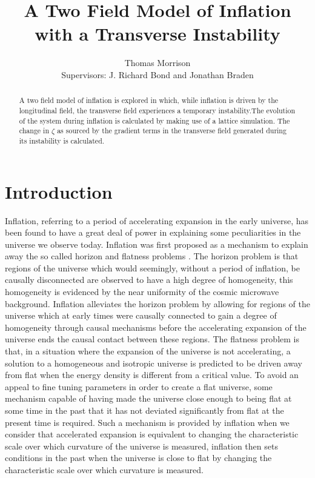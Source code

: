 \documentclass[letterpaper,11pt]{article}
\title{A Two Field Model of Inflation with a Transverse Instability}
\author{Thomas Morrison\\ Supervisors: J. Richard Bond and Jonathan Braden}
\begin{document}
\maketitle
\begin{abstract}
A two field model of inflation is explored in which, while inflation is driven by the longitudinal field, the transverse field experiences a temporary instability.The evolution of the system during inflation is calculated by making use of a lattice simulation. The change in $\zeta$ as sourced by the gradient terms in the transverse field generated during its instability is calculated.
\end{abstract}
\section{Introduction}
Inflation, referring to a period of accelerating expansion in the early universe, has been found to have a great deal of power in explaining some peculiarities in the universe we observe today. 
Inflation was first proposed as a mechanism to explain away the so called horizon and flatness problems \cite{guth81}. The horizon problem is that regions of the universe which would seemingly, without a period of inflation, be causally disconnected are observed to have a high degree of homogeneity, this homogeneity is evidenced by the near uniformity of the cosmic microwave background. Inflation alleviates the horizon problem by allowing for regions of the universe which at early times were causally connected to gain a degree of homogeneity through causal mechanisms before the accelerating expansion of the universe ends the causal contact between these regions. The flatness problem is that, in a situation where the expansion of the universe is not accelerating, a solution to a homogeneous and isotropic universe is predicted to be driven away from flat when the energy density is different from a critical value. To avoid an appeal to fine tuning parameters in order to create a flat universe, some mechanism capable of having made the universe close enough to being flat at some time in the past that it has not deviated significantly from flat at the present time is required. Such a mechanism is provided by inflation when we consider that accelerated expansion is equivalent to changing the characteristic scale over which curvature of the universe is measured, inflation then sets conditions in the past when the universe is close to flat by changing the characteristic scale over which curvature is measured.
\end{document}
